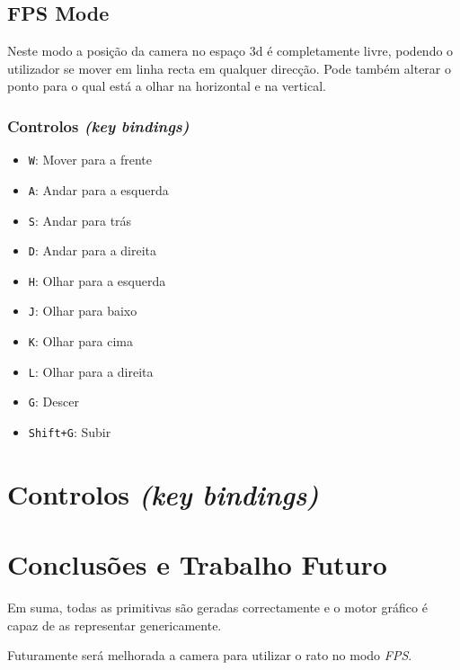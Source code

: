 \documentclass[a4paper]{article}
\begin{document}
\subsection{FPS Mode}

Neste modo a posição da camera no espaço 3d é completamente livre, podendo o utilizador se mover em linha recta em qualquer direcção. Pode também alterar o ponto para o qual está a olhar na horizontal e na vertical.
\subsubsection{Controlos \textit{(key bindings)}}

\begin{itemize}
    \item \texttt{W}: Mover para a frente
    \item \texttt{A}: Andar para a esquerda
    \item \texttt{S}: Andar para trás
    \item \texttt{D}: Andar para a direita
    \item \texttt{H}: Olhar para a esquerda
    \item \texttt{J}: Olhar para baixo
    \item \texttt{K}: Olhar para cima
    \item \texttt{L}: Olhar para a direita
    \item \texttt{G}: Descer
    \item \texttt{Shift+G}: Subir
\end{itemize}


\section{Controlos \textit{(key bindings)}}

\section{Conclusões e Trabalho Futuro}
Em suma, todas as primitivas são geradas correctamente e o motor gráfico é capaz de as representar genericamente.

Futuramente será melhorada a camera para utilizar o rato no modo \textit{FPS}.
\end{document}
